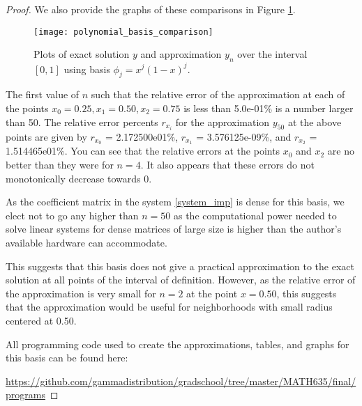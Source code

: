 \begin{proof}
  We also provide the graphs of these comparisons in Figure \ref{poly_plot}.

  \begin{figure}[h!]
    \begin{center}
      \texttt{[image: polynomial\_basis\_comparison]}
    \end{center}
    \caption{Plots of exact solution $y$ and approximation $y_n$ over the interval $[0, 1]$
       using basis $\phi_j = x^j(1-x)^j$.}\label{poly_plot}
  \end{figure}

  The first value of $n$ such that the relative error of the approximation at
  each of the points $x_0=0.25, x_1=0.50, x_2=0.75$ is less than 5.0e-01\% is a number larger than 50.
  The relative error percents $r_{x_i}$ for the approximation $y_{50}$ at the above points are given by $r_{x_0}$ = 2.172500e01\%,
  $r_{x_1}$ = 3.576125e-09\%, and $r_{x_2}$ = 1.514465e01\%. You can see that the relative errors at the points $x_0$ and $x_2$ are no
  better than they were for $n=4$. It also appears that these errors do not monotonically decrease towards 0.

  As the coefficient matrix in the system \eqref{system_imp} is dense for this basis,
  we elect not to go any higher than $n=50$ as the computational power needed to solve
  linear systems for dense matrices of large size is higher than
  the author's available hardware can accommodate.

  This suggests that this basis does not give a practical
  approximation to the exact solution at all points of the interval of definition.
  However, as the relative error of the approximation is very small for $n=2$
  at the point $x=0.50$, this suggests that the approximation would be useful
  for neighborhoods with small radius centered at 0.50.

  All programming code used to create the approximations, tables, and graphs
  for this basis can be found here:

  \url{https://github.com/gammadistribution/gradschool/tree/master/MATH635/final/programs}
\end{proof}